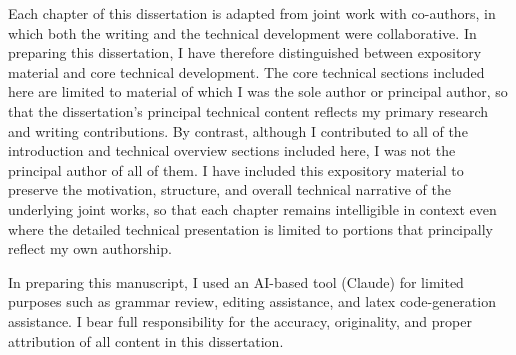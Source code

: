 

Each chapter of this dissertation is adapted from joint work with co-authors, in which both the writing and the technical development were collaborative. In preparing this dissertation, I have therefore distinguished between expository material and core technical development. The core technical sections included here are limited to material of which I was the sole author or principal author, so that the dissertation's principal technical content reflects my primary research and writing contributions. By contrast, although I contributed to all of the introduction and technical overview sections included here, I was not the principal author of all of them. I have included this expository material to preserve the motivation, structure, and overall technical narrative of the underlying joint works, so that each chapter remains intelligible in context even where the detailed technical presentation is limited to portions that principally reflect my own authorship.

In preparing this manuscript, I used an AI-based tool (Claude) for limited purposes such as grammar review, editing assistance, and latex code-generation assistance. I bear full responsibility for the accuracy, originality, and proper attribution of all content in this dissertation.